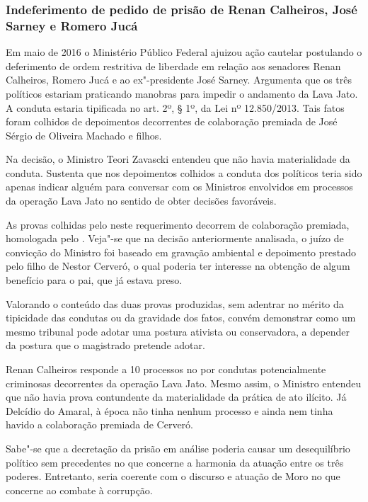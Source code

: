 \subsubsection{Indeferimento de pedido de prisão de Renan Calheiros,
José Sarney e Romero Jucá}

Em maio de 2016 o Ministério Público Federal ajuizou ação cautelar
postulando o deferimento de ordem restritiva de liberdade em relação aos
senadores Renan Calheiros, Romero Jucá e ao ex"-presidente José Sarney.
Argumenta que os três políticos estariam praticando manobras para
impedir o andamento da Lava Jato. A conduta estaria tipificada no art.
2º, § 1º, da Lei nº 12.850/2013. Tais fatos foram colhidos de
depoimentos decorrentes de colaboração premiada de José Sérgio de
Oliveira Machado e filhos.

Na decisão, o Ministro Teori Zavascki entendeu que não havia
materialidade da conduta. Sustenta que nos depoimentos colhidos a
conduta dos políticos teria sido apenas indicar alguém para conversar
com os Ministros envolvidos em processos da operação Lava Jato no
sentido de obter decisões favoráveis.

As provas colhidas pelo  neste requerimento decorrem de colaboração
premiada, homologada pelo . Veja"-se que na decisão anteriormente
analisada, o juízo de convicção do Ministro foi baseado em gravação
ambiental e depoimento prestado pelo filho de Nestor Cerveró, o qual
poderia ter interesse na obtenção de algum benefício para o pai, que já
estava preso.

Valorando o conteúdo das duas provas produzidas, sem adentrar no mérito
da tipicidade das condutas ou da gravidade dos fatos, convém demonstrar
como um mesmo tribunal pode adotar uma postura ativista ou conservadora,
a depender da postura que o magistrado pretende adotar.

Renan Calheiros responde a 10 processos no  por condutas
potencialmente criminosas decorrentes da operação Lava Jato. Mesmo
assim, o Ministro entendeu que não havia prova contundente da
materialidade da prática de ato ilícito. Já Delcídio do Amaral, à época
não tinha nenhum processo e ainda nem tinha havido a colaboração
premiada de Cerveró.

Sabe"-se que a decretação da prisão em análise poderia causar um
desequilíbrio político sem precedentes no que concerne a harmonia da
atuação entre os três poderes. Entretanto, seria coerente com o discurso
e atuação de Moro no que concerne ao combate à corrupção.

